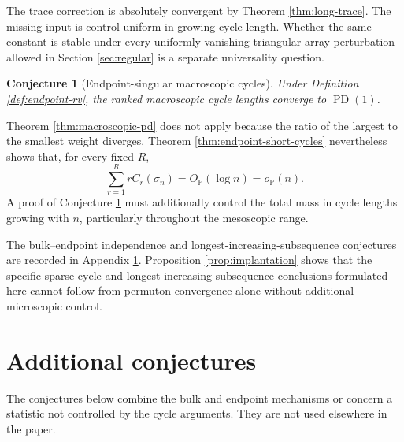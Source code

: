 \documentclass[11pt]{article}
\newtheorem{conjecture}[theorem]{Conjecture}
\theoremstyle{remark}
\newcommand{\Pp}{\mathbb P}
\begin{document}
The trace correction is absolutely convergent by Theorem
\ref{thm:long-trace}.  The missing input is control uniform in growing cycle
length.  Whether the same constant is stable under every uniformly vanishing
triangular-array perturbation allowed in Section \ref{sec:regular} is a
separate universality question.

\begin{conjecture}[Endpoint-singular macroscopic cycles]
\label{conj:endpoint-pd}
Under Definition \ref{def:endpoint-rv}, the ranked macroscopic cycle lengths
converge to $\operatorname{PD}(1)$.
\end{conjecture}

Theorem \ref{thm:macroscopic-pd} does not apply because the ratio of the largest
to the smallest weight diverges.  Theorem
\ref{thm:endpoint-short-cycles} nevertheless shows that, for every fixed $R$,
\[
        \sum_{r=1}^R rC_r(\sigma_n)
        =O_{\Pp}(\log n)=o_{\Pp}(n).
\]
A proof of Conjecture \ref{conj:endpoint-pd} must additionally control the total
mass in cycle lengths growing with $n$, particularly throughout the mesoscopic
range.

The bulk--endpoint independence and longest-increasing-subsequence conjectures
are recorded in Appendix \ref{app:further-conjectures}.  Proposition
\ref{prop:implantation} shows that the specific sparse-cycle and
longest-increasing-subsequence conclusions formulated here cannot follow from
permuton convergence alone without additional microscopic control.

\appendix
\section{Additional conjectures}\label{app:further-conjectures}

The conjectures below combine the bulk and endpoint mechanisms or concern a
statistic not controlled by the cycle arguments.  They are not used elsewhere
in the paper.
\end{document}
